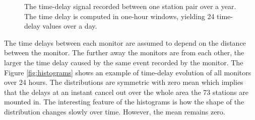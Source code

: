 \documentclass[12pt,a4paper,english]{article}
\begin{document}
\begin{figure}[ht] 
  \centering 
{}
\caption{The time-delay signal recorded between one station pair over a year. The time delay is computed in one-hour windows, yielding 24 time-delay values over a day.}
\label{fig:examplesignal}
\end{figure}



The time delays between each monitor are assumed to depend on the distance between the monitor. The further away the monitors are from each other, the larger the time delay caused by the same event recorded by the monitor. The Figure \ref{fig:histograms} shows an example of time-delay evolution of all monitors over 24 hours. The distributions are symmetric with zero mean which implies that the delays at an instant cancel out over the whole area the 73 stations are mounted in. The interesting feature of the histograms is how the shape of the distribution changes slowly over time. However, the mean remains zero.
\end{document}
